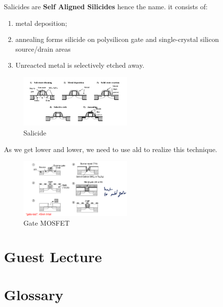 \documentclass[
]{article}
\begin{document}
Salicides are \textbf{Self Aligned Silicides} hence the name. it
consists of:

\begin{enumerate}
\def\labelenumi{\arabic{enumi}.}
\item
  metal deposition;
\item
  annealing forms silicide on polysilicon gate and single-crystal
  silicon source/drain areas
\item
  Unreacted metal is selectively etched away.
\end{enumerate}

\begin{figure}
\hypertarget{fig:enter-label}{%
\centering
\includegraphics[width=0.5\textwidth,height=\textheight]{salicide.png}
\caption{Salicide}\label{fig:enter-label}
}
\end{figure}

As we get lower and lower, we need to use {ald} to realize this
technique.

\begin{figure}
\hypertarget{fig:enter-label}{%
\centering
\includegraphics[width=0.5\textwidth,height=\textheight]{gate_MOSFET.png}
\caption{Gate MOSFET}\label{fig:enter-label}
}
\end{figure}

\hypertarget{guest-lecture}{%
\section{Guest Lecture}\label{guest-lecture}}

\hypertarget{glossary}{%
\section{Glossary}\label{glossary}}
\end{document}
